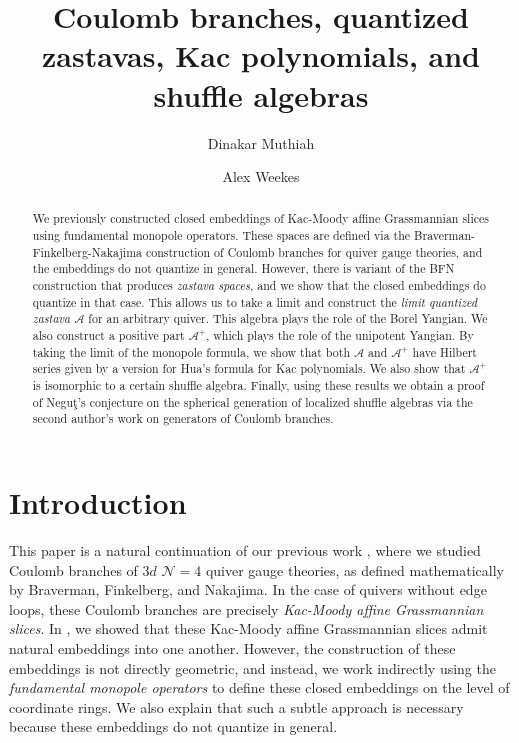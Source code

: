 \documentclass[11pt,reqno]{amsart}
\numberwithin{equation}{section}
\theoremstyle{definition}
\newcommand{\cN}{\mathcal{N}}
\begin{document}
\title[Coulomb branches, quantized zastavas, Kac polynomials, and shuffle algebras]{Coulomb branches, quantized zastavas, Kac polynomials, and shuffle algebras}
\author{Dinakar Muthiah}
\address{D.~Muthiah:
School of Mathematics and Statistics,
University of Glasgow,
University Place,
Glasgow G12 8QQ,
Scotland
}
\author{Alex Weekes}
\address{A.~Weekes: Département de mathématiques, Université de Sherbrooke, Sherbrooke J1K 2R1, Canada}

\maketitle

\begin{abstract}
We previously constructed closed embeddings of Kac-Moody affine Grassmannian slices using fundamental monopole operators. These spaces are defined via the Braverman-Finkelberg-Nakajima construction of Coulomb branches for quiver gauge theories, and the embeddings do not quantize in general. However, there is variant of the BFN construction that produces \emph{zastava spaces}, and we show that the closed embeddings do quantize in that case. This allows us to take a limit and construct the \emph{limit quantized zastava} $\mathcal{A}$ for an arbitrary quiver. This algebra plays the role of the Borel Yangian. We also construct a positive part $\mathcal{A}^+$, which plays the role of the unipotent Yangian. By taking the limit of the monopole formula, we show that both $\mathcal{A}$ and $\mathcal{A}^+$ have Hilbert series given by a version for Hua's formula for Kac polynomials.  We also show that $\mathcal{A}^+$ is isomorphic to a certain shuffle algebra. Finally, using these results we obtain a proof of Negu{\c t}'s conjecture on the spherical generation of localized shuffle algebras via the second author's work on generators of Coulomb branches.
\end{abstract}



\section{Introduction}

This paper is a natural continuation of our previous work \cite{MW2}, where we studied Coulomb branches of $3d$ $\cN=4$ quiver gauge theories, as defined mathematically by Braverman, Finkelberg, and Nakajima. In the case of quivers without edge loops, these Coulomb branches are precisely \emph{Kac-Moody affine Grassmannian slices}. In \cite{MW2}, we showed that these Kac-Moody affine Grassmannian slices admit natural embeddings into one another. However, the construction of these embeddings is not directly geometric, and instead, we work indirectly using the \emph{fundamental monopole operators} to define these closed embeddings on the level of coordinate rings. We also explain that such a subtle approach is necessary because these embeddings do not quantize in general.
\end{document}
